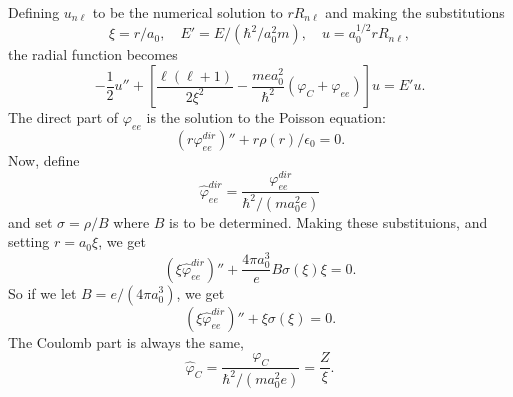 \documentclass[twocolumn]{article}
\begin{document}
\begin{large}
Defining $u_{n\ell}$ to be the numerical solution to $rR_{n\ell}$ and making the substitutions
\begin{equation}
    \xi = r/a_0,\quad E' = E/(\hbar^2/a_0^2m),\quad u = a_0^{1/2}rR_{n\ell},
\end{equation}
the radial function becomes
\begin{equation}
    \label{5maj1822}
    -\frac{1}{2}u'' + \left[\frac{\ell(\ell+1)}{2\xi^2}-\frac{mea_0^2}{\hbar^2}(\varphi_C+\varphi_{ee})\right]u = E'u.
\end{equation}
The direct part of $\varphi_{ee}$ is the solution to the Poisson equation:
\begin{equation}
    (r\varphi_{ee}^{dir})'' + r\rho(r)/\epsilon_0 = 0.
\end{equation}
Now, define 
\begin{equation}
    \hat{\varphi}_{ee}^{dir} = \frac{\varphi_{ee}^{dir}}{\hbar^2/(ma_0^2e)}
\end{equation}
and set $\sigma = \rho/B$ where $B$ is to be determined. Making these substituions, and setting $r=a_0\xi$, we get
\begin{equation}
    \label{5maj1821}
    (\xi\hat{\varphi}_{ee}^{dir})'' + \frac{4\pi a_0^3}{e}B\sigma(\xi)\xi = 0.
\end{equation}
So if we let $B=e/(4\pi a_0^3)$, we get 
\begin{equation}
    (\xi\hat{\varphi}_{ee}^{dir})'' + \xi\sigma(\xi) = 0.
\end{equation}
The Coulomb part is always the same,
\begin{equation}
    \hat{\varphi}_C = \frac{\varphi_C}{\hbar^2/(ma_0^2e)} = \frac{Z}{\xi}.
\end{equation}




\end{large}
\end{document}
